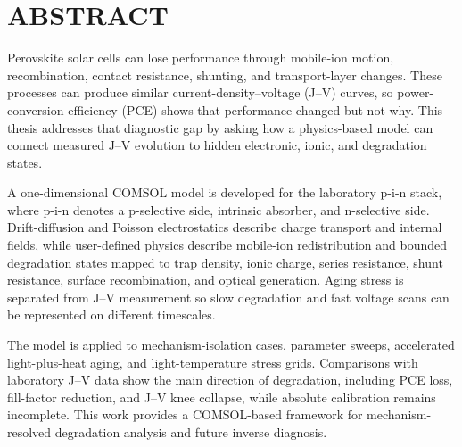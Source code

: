 \chapter*{ABSTRACT}
Perovskite solar cells can lose performance through mobile-ion motion,
recombination, contact resistance, shunting, and transport-layer changes. These
processes can produce similar current-density--voltage (J--V) curves, so
power-conversion efficiency (PCE) shows that performance changed but not why.
This thesis addresses that diagnostic gap by asking how a physics-based model
can connect measured J--V evolution to hidden electronic, ionic, and degradation
states.

A one-dimensional COMSOL model is developed for the laboratory p-i-n stack,
where p-i-n denotes a p-selective side, intrinsic absorber, and n-selective
side. Drift-diffusion and Poisson electrostatics describe charge transport and
internal fields, while user-defined physics describe mobile-ion redistribution
and bounded degradation states mapped to trap density, ionic charge, series
resistance, shunt resistance, surface recombination, and optical generation.
Aging stress is separated from J--V measurement so slow degradation and fast
voltage scans can be represented on different timescales.

The model is applied to mechanism-isolation cases, parameter sweeps,
accelerated light-plus-heat aging, and light-temperature stress grids.
Comparisons with laboratory J--V data show the main direction of degradation,
including PCE loss, fill-factor reduction, and J--V knee collapse, while
absolute calibration remains incomplete. This work provides a COMSOL-based
framework for mechanism-resolved degradation analysis and future inverse
diagnosis.

\clearpage
